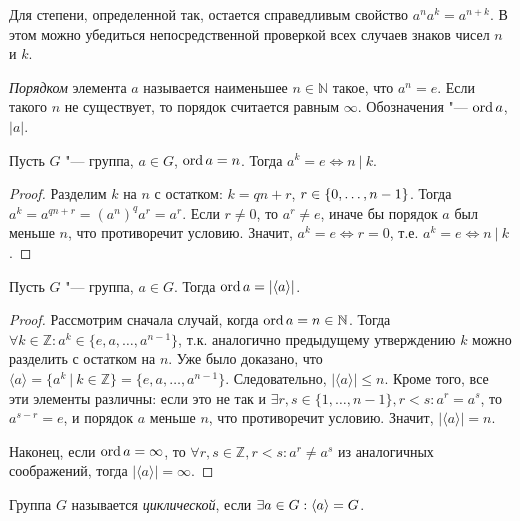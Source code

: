 \begin{note}
	Для степени, определенной так, остается справедливым свойство $a^{n}a^{k} = a^{n + k}$. В этом можно убедиться непосредственной проверкой всех случаев знаков чисел $n$ и $k$.
\end{note}

\begin{definition}
	\textit{Порядком} элемента $a$ называется наименьшее $n \in \mathbb{N}$ такое, что $a^n = e$. Если такого $n$ не существует, то порядок считается равным $\infty$. Обозначения "--- $\operatorname{ord}{a}$, $|a|$.
\end{definition}

\begin{proposition}
	Пусть $G$ "--- группа, $a \in G$, $\operatorname{ord}{a} = n$. Тогда $a^k = e \Leftrightarrow n~|~k$.
\end{proposition}

\begin{proof}
	Разделим $k$ на $n$ с остатком: $k = qn + r$, $r \hm{\in} \{0, \dots, n-1\}$. Тогда $a^k = a^{qn + r} = (a^n)^qa^r = a^r$. Если $r \ne 0$, то $a^r \ne e$, иначе бы порядок $a$ был меньше $n$, что противоречит условию. Значит, $a^k = e \Leftrightarrow r = 0$, т.\:е. $a^k = e \Leftrightarrow n~|~k$.
\end{proof}

\begin{proposition}
	Пусть $G$ "--- группа, $a \in G$. Тогда $\operatorname{ord}{a} = |\langle a\rangle|$.
\end{proposition}

\begin{proof}
	Рассмотрим сначала случай, когда $\operatorname{ord}{a} = n \in \mathbb{N}$. Тогда $\forall k \in \mathbb{Z}: a^k \in \{e, a, \dots, a^{n-1}\}$, т.\:к. аналогично предыдущему утверждению $k$ можно разделить с остатком на $n$. Уже было доказано, что $\langle a\rangle = \{a^k~|~k \in \mathbb{Z}\} = \{e, a, \dots, a^{n-1}\}$. Следовательно, $|\langle a\rangle| \le n$. Кроме того, все эти элементы различны: если это не так и $\exists r, s \in \{1, \dots, n-1\}, r < s: a^r = a^s$, то $a^{s - r} = e$, и порядок $a$ меньше $n$, что противоречит условию. Значит, $|\langle a\rangle| = n$.
	
	Наконец, если $\operatorname{ord}{a} = \infty$, то $\forall r, s \in \mathbb{Z}, r < s: a^r \ne a^s$ из аналогичных соображений, тогда $|\langle a\rangle| = \infty$.
\end{proof}

\begin{definition}
	Группа $G$ называется \textit{циклической}, если $\exists a \hm{\in} G: \langle a\rangle = G$.
\end{definition}

